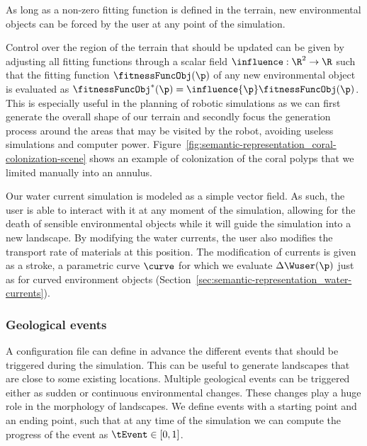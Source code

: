 As long as a non-zero fitting function is defined in the terrain, new environmental objects can be forced by the user at any point of the simulation. 

Control over the region of the terrain that should be updated can be given by adjusting all fitting functions through a scalar field $\influence: \R^2 \to \R $ such that the fitting function $\fitnessFuncObj(\p)$ of any new environmental object is evaluated as $\fitnessFuncObj^*(\p) = \influence{\p} \fitnessFuncObj(\p)$. This is especially useful in the planning of robotic simulations as we can first generate the overall shape of our terrain and secondly focus the generation process around the areas that may be visited by the robot, avoiding useless simulations and computer power. 
Figure~\ref{fig:semantic-representation_coral-colonization-scene} shows an example of colonization of the coral polyps that we limited manually into an annulus.


Our water current simulation is modeled as a simple vector field. As such, the user is able to interact with it at any moment of the simulation, allowing for the death of sensible environmental objects while it will guide the simulation into a new landscape. By modifying the water currents, the user also modifies the transport rate of materials at this position. The modification of currents is given as a stroke, a parametric curve $\curve$ for which we evaluate $\Delta \Wuser(\p)$ just as for curved environment objects (Section~\ref{sec:semantic-representation_water-currents}).

\subsubsection{Geological events}
\label{sec:semantic-representation_events}
A configuration file can define in advance the different events that should be triggered during the simulation. This can be useful to generate landscapes that are close to some existing locations. 
Multiple geological events can be triggered either as sudden or continuous environmental changes. These changes play a huge role in the morphology of landscapes.
We define events with a starting point and an ending point, such that at any time of the simulation we can compute the progress of the event as $\tEvent \in [0, 1]$.

